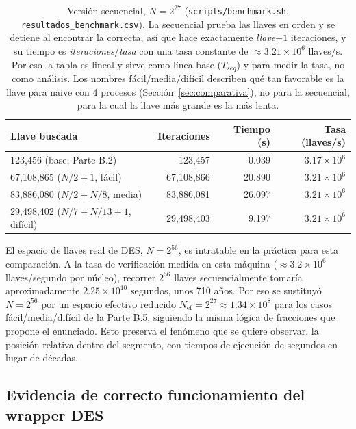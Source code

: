 \documentclass[11pt,letterpaper]{article}
\begin{document}
\begin{table}[H]
\centering
\small
\begin{tabular}{lrrr}
\toprule
\textbf{Llave buscada} & \textbf{Iteraciones} & \textbf{Tiempo (s)} & \textbf{Tasa (llaves/s)} \\
\midrule
123{,}456 (base, Parte B.2)               & 123{,}457    & 0.039  & $3.17\times10^{6}$ \\
67{,}108{,}865 ($N/2+1$, fácil)          & 67{,}108{,}866 & 20.890 & $3.21\times10^{6}$ \\
83{,}886{,}080 ($N/2+N/8$, media)        & 83{,}886{,}081 & 26.097 & $3.21\times10^{6}$ \\
29{,}498{,}402 ($N/7+N/13+1$, difícil)   & 29{,}498{,}403 & 9.197  & $3.21\times10^{6}$ \\
\bottomrule
\end{tabular}
\caption{Versión secuencial, $N=2^{27}$ (\texttt{scripts/benchmark.sh},
\texttt{resultados\_benchmark.csv}). La secuencial prueba las llaves en
orden y se detiene al encontrar la correcta, así que hace
exactamente \textit{llave}$+1$ iteraciones, y su tiempo es
\textit{iteraciones}$/$\textit{tasa} con una tasa constante de
$\approx3.21\times10^{6}$ llaves/s. Por eso la tabla es lineal y sirve
como línea base ($T_{seq}$) y para medir la tasa, no como análisis.
Los nombres fácil/media/difícil describen qué tan favorable es la llave
para naive con 4 procesos (Sección~\ref{sec:comparativa}), no para la
secuencial, para la cual la llave más grande es la más lenta.}
\label{tab:secuencial}
\end{table}

El espacio de llaves real de DES, $N = 2^{56}$, es intratable en la
práctica para esta comparación. A la tasa de verificación medida en
esta máquina ($\approx 3.2 \times 10^{6}$ llaves/segundo por núcleo),
recorrer $2^{56}$ llaves secuencialmente tomaría aproximadamente
$2.25 \times 10^{10}$ segundos, unos 710 años. Por eso se sustituyó
$N=2^{56}$ por un espacio efectivo reducido
$N_{\text{ef}} = 2^{27} \approx 1.34 \times 10^{8}$ para los casos
fácil/media/difícil de la Parte B.5, siguiendo la misma lógica de
fracciones que propone el enunciado. Esto preserva el fenómeno que se
quiere observar, la posición relativa dentro del segmento, con tiempos
de ejecución de segundos en lugar de décadas.

\subsection{Evidencia de correcto funcionamiento del wrapper DES}
\label{sec:des-wrapper}
\end{document}
